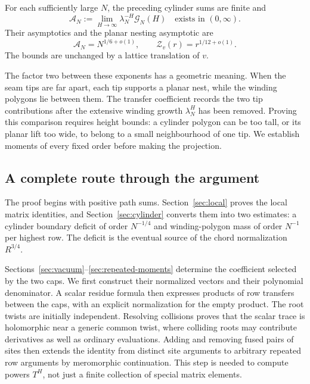 \begin{theorem}\label{thm:amplitude}
For each sufficiently large $N$, the preceding cylinder sums are finite and
\[
 \mathcal A_N:=\lim_{H\to\infty}\lambda_N^{-H}\mathcal G_N(H)
 \quad\text{exists in }(0,\infty).
\]
Their asymptotics and the planar nesting asymptotic are
\[
 \mathcal A_N=N^{1/6+o(1)},
 \qquad \mathcal Z_v(r)=r^{1/12+o(1)}.
\]
The bounds are unchanged by a lattice translation of $v$.
\end{theorem}



The factor two between these exponents has a geometric meaning. When the seam tips are far apart, each tip supports a planar nest, while the winding polygons lie between them. The transfer coefficient records the two tip contributions after the extensive winding growth $\lambda_N^H$ has been removed. Proving this comparison requires height bounds: a cylinder polygon can be too tall, or its planar lift too wide, to belong to a small neighbourhood of one tip. We establish moments of every fixed order before making the projection.

\subsection{A complete route through the argument}

The proof begins with positive path sums. Section~\ref{sec:local} proves the local matrix identities, and Section~\ref{sec:cylinder} converts them into two estimates: a cylinder boundary deficit of order $N^{-1/4}$ and winding-polygon mass of order $N^{-1}$ per highest row. The deficit is the eventual source of the chord normalization $R^{3/4}$.

Sections~\ref{sec:vacuum}--\ref{sec:repeated-moments} determine the coefficient selected by the two caps. We first construct their normalized vectors and their polynomial denominator. A scalar residue formula then expresses products of row transfers between the caps, with an explicit normalization for the empty product. The root twists are initially independent. Resolving collisions proves that the scalar trace is holomorphic near a generic common twist, where colliding roots may contribute derivatives as well as ordinary evaluations. Adding and removing fused pairs of sites then extends the identity from distinct site arguments to arbitrary repeated row arguments by meromorphic continuation. This step is needed to compute powers $T^H$, not just a finite collection of special matrix elements.


